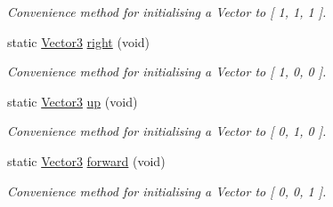 \begin{DoxyCompactItemize}
\begin{DoxyCompactList}\small\item\em Convenience method for initialising a Vector to \mbox{[} 1, 1, 1 \mbox{]}. \end{DoxyCompactList}\item 
static \hyperlink{classsparky_1_1_vector3}{Vector3} \hyperlink{classsparky_1_1_vector3_a5aa189b8cd595fdbe3fcbcfb03ad6f8e}{right} (void)
\begin{DoxyCompactList}\small\item\em Convenience method for initialising a Vector to \mbox{[} 1, 0, 0 \mbox{]}. \end{DoxyCompactList}\item 
static \hyperlink{classsparky_1_1_vector3}{Vector3} \hyperlink{classsparky_1_1_vector3_af54c2e1458f00c76b06c61641c856c95}{up} (void)
\begin{DoxyCompactList}\small\item\em Convenience method for initialising a Vector to \mbox{[} 0, 1, 0 \mbox{]}. \end{DoxyCompactList}\item 
static \hyperlink{classsparky_1_1_vector3}{Vector3} \hyperlink{classsparky_1_1_vector3_a98762988b92f7fcc95106a0338f8c015}{forward} (void)
\begin{DoxyCompactList}\small\item\em Convenience method for initialising a Vector to \mbox{[} 0, 0, 1 \mbox{]}. \end{DoxyCompactList}\end{DoxyCompactItemize}
